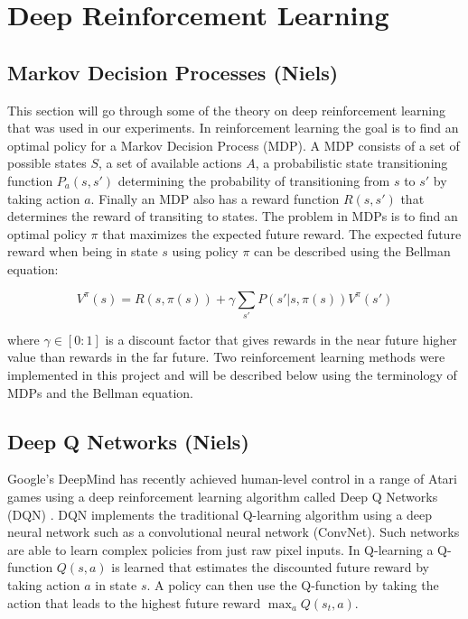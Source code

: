 \documentclass{article}
\begin{document}
\section{Deep Reinforcement Learning}
\label{sec:format}

\subsection{Markov Decision Processes (Niels)}
This section will go through some of the theory on deep reinforcement learning that was used in our experiments. In reinforcement learning the goal is to find an optimal policy for a Markov Decision Process (MDP). A MDP consists of a set of possible states $S$, a set of available actions $A$, a probabilistic state transitioning function $P_{a}(s,s')$ determining the probability of transitioning from $s$ to $s'$ by taking action $a$. Finally an MDP also has a reward function $R(s,s')$ that determines the reward of transiting to states. The problem in MDPs is to find an optimal policy $\pi$ that maximizes the expected future reward. The expected future reward when being in state $s$ using policy $\pi$ can be described using the Bellman equation:

\begin{equation}
V^\pi(s)= R(s,\pi(s)) + \gamma \sum_{s'} P(s'|s,\pi(s)) V^\pi(s') 
\end{equation} 

where $\gamma \in [0:1]$ is a discount factor that gives rewards in the near future higher value than rewards in the far future. Two reinforcement learning methods were implemented in this project and will be described below using the terminology of MDPs and the Bellman equation.
 
\subsection{Deep Q Networks (Niels)}
Google's DeepMind has recently achieved human-level control in a range of Atari games using a deep reinforcement learning algorithm called Deep Q Networks (DQN) \cite{mnih2015human}. DQN implements the traditional Q-learning algorithm using a deep neural network such as a convolutional neural network (ConvNet). Such networks are able to learn complex policies from just raw pixel inputs. In Q-learning a Q-function $Q(s,a)$ is learned that estimates the discounted future reward by taking action $a$ in state $s$. A policy can then use the Q-function by taking the action that leads to the highest future reward $\max_{a}Q(s_{t}, a)$. 
\end{document}
